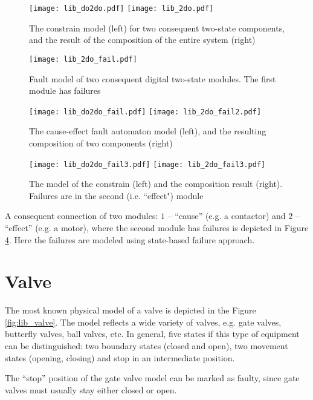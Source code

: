 \begin{figure}[!th]
	\centering
	\texttt{[image: lib\_do2do.pdf]}
	\texttt{[image: lib\_2do.pdf]}
	\caption{The constrain model (left) for two consequent two-state components,
	and the result of the composition of the entire system (right)}
	\label{fig:lib_2do}
\end{figure}

\begin{figure}[!th]
	\centering
	\texttt{[image: lib\_2do\_fail.pdf]}
	\caption{Fault model of two consequent digital two-state modules. The
	first module has failures}
	\label{fig:lib_2do_fail}
\end{figure}


\begin{figure}[!th]
	\centering
	\texttt{[image: lib\_do2do\_fail.pdf]}
	\texttt{[image: lib\_2do\_fail2.pdf]}
	\caption{The cause-effect fault automaton model (left), and the resulting
	composition of two components (right)}
	\label{fig:lib_2do_fail2}
\end{figure}

\begin{figure}[!th]
	\centering
	\texttt{[image: lib\_do2do\_fail3.pdf]}
	\texttt{[image: lib\_2do\_fail3.pdf]}
	\caption{The model of the constrain (left) and the composition result (right).
	Failures are in the second (i.e. ``effect") module}
	\label{fig:lib_2do_fail3}
\end{figure}

A consequent connection of two modules: $1$ -- ``cause'' (e.g. a contactor) and
$2$ -- ``effect'' (e.g. a motor), where the second module has failures is
depicted in Figure \ref{fig:lib_2do_fail3}. Here the failures are modeled using
state-based failure approach.


\section{Valve}

The most known physical model of a valve is depicted in the Figure
\ref{fig:lib_valve}.
The model reflects a wide variety of valves, e.g. gate valves, butterfly valves,
ball valves, etc. In general, five states if this type of equipment can be
distinguished: two boundary states (closed and open), two movement states
(opening, closing) and stop in an intermediate position.

The ``stop'' position of the gate valve model can be marked as faulty,
since gate valves must usually stay either closed or open.

